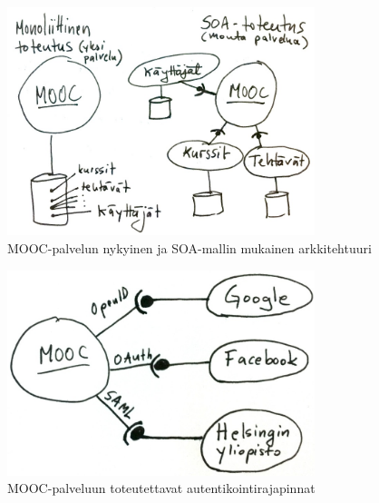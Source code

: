 \documentclass[finnish,gradu]{tktltiki}
\begin{document}
  \begin{figure}
    \centering
    \includegraphics[width=0.8\textwidth]{images/mooc-arkkitehtuuri.jpg}
    \caption{MOOC-palvelun nykyinen ja SOA-mallin mukainen arkkitehtuuri}
    \label{fig:mooc-arkkitehtuuri}
  \end{figure}

  \begin{figure}
    \centering
    \includegraphics[width=0.8\textwidth]{images/mooc-autentikointirajapinnat.jpg}
    \caption{MOOC-palveluun toteutettavat autentikointirajapinnat}
    \label{fig:mooc-autentikointirajapinnat}
  \end{figure}
\end{document}
